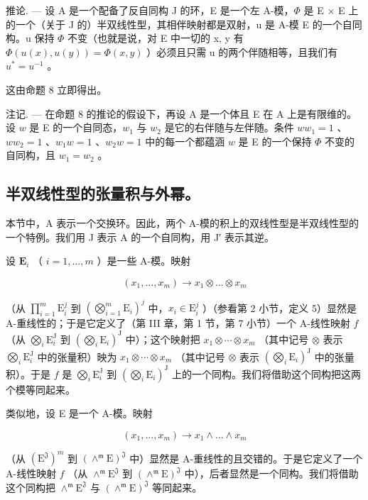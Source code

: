 推论. --- 设 A 是一个配备了反自同构 J 的环，E 是一个左 A-模，\(\Phi\) 是 E × E 上的一个（关于 J 的）半双线性型，其相伴映射都是双射，u 是 A-模 E 的一个自同构。u 保持 \(\Phi\) 不变（也就是说，对 E 中一切的 x, y 有 \(\Phi(u(x), u(y)) = \Phi(x, y)\) ）必须且只需 u 的两个伴随相等，且我们有 \(u^{*} = u^{-1}\) 。

这由命题 8 立即得出。

注记. --- 在命题 8 的推论的假设下，再设 A 是一个体且 E 在 A 上是有限维的。设 \(w\) 是 E 的一个自同态，\(w_{1}\) 与 \(w_{2}\) 是它的右伴随与左伴随。条件 \(ww_{1}=1\) 、\(ww_{2}=1\) 、\(w_{1}w=1\) 、\(w_{2}w=1\) 中的每一个都蕴涵 \(w\) 是 E 的一个保持 \(\Phi\) 不变的自同构，且 \(w_{1}=w_{2}\) 。

\subsection{半双线性型的张量积与外幂。}

本节中，A 表示一个交换环。因此，两个 A-模的积上的双线性型是半双线性型的一个特例。我们用 J 表示 A 的一个自同构，用 J′ 表示其逆。

设 \(\mathbf{E}_i\) （ \(i = 1, \ldots, m\) ）是一些 A-模。映射

\[
(x _ {1}, \dots , x _ {m}) \rightarrow x _ {1} \otimes \dots \otimes x _ {m}
\]

（从 \(\prod_{i=1}^{m}\mathrm{E}_{i}^{j}\) 到 \((\bigotimes_{i=1}^{m}\mathrm{E}_{i})^{j}\) 中，\(x_{i}\in\mathrm{E}_{i}^{j}\) ）（参看第 2 小节，定义 5）显然是 A-重线性的；于是它定义了（第 III 章，第 1 节，第 7 小节）一个 A-线性映射 \(f\) （从 \(\bigotimes_{i}\mathrm{E}_{i}^{\mathrm{J}}\) 到 \((\bigotimes_{i}\mathrm{E}_{i})^{\mathrm{J}}\) 中）；这个映射把 \(x_{1}\otimes\cdots\otimes x_{m}\) （其中记号 \(\otimes\) 表示 \(\bigotimes_{i}\mathrm{E}_{i}^{\mathrm{J}}\) 中的张量积）映为 \(x_{1}\otimes\cdots\otimes x_{m}\) （其中记号 \(\otimes\) 表示 \((\bigotimes_{i}\mathrm{E}_{i})^{\mathrm{J}}\) 中的张量积）。于是 \(f\) 是 \(\bigotimes_{i}\mathrm{E}_{i}^{\mathrm{J}}\) 到 \((\bigotimes_{i}\mathrm{E}_{i})^{\mathrm{J}}\) 上的一个同构。我们将借助这个同构把这两个模等同起来。

类似地，设 E 是一个 A-模。映射

\[
(x _ {1}, \dots , x _ {m}) \rightarrow x _ {1} \wedge \dots \wedge x _ {m}
\]

（从 \((\mathrm{E}^{\mathfrak{J}})^{m}\) 到 \((\wedge^{\mathfrak{m}}\mathrm{E})^{\mathfrak{J}}\) 中）显然是 A-重线性的且交错的。于是它定义了一个 A-线性映射 \(f\) （从 \(\wedge^{\mathfrak{m}}\mathrm{E}^{\mathfrak{J}}\) 到 \((\wedge^{\mathfrak{m}}\mathrm{E})^{\mathfrak{J}}\) 中），后者显然是一个同构。我们将借助这个同构把 \(\wedge^{\mathfrak{m}}\mathrm{E}^{\mathfrak{J}}\) 与 \((\wedge^{\mathfrak{m}}\mathrm{E})^{\mathfrak{J}}\) 等同起来。

